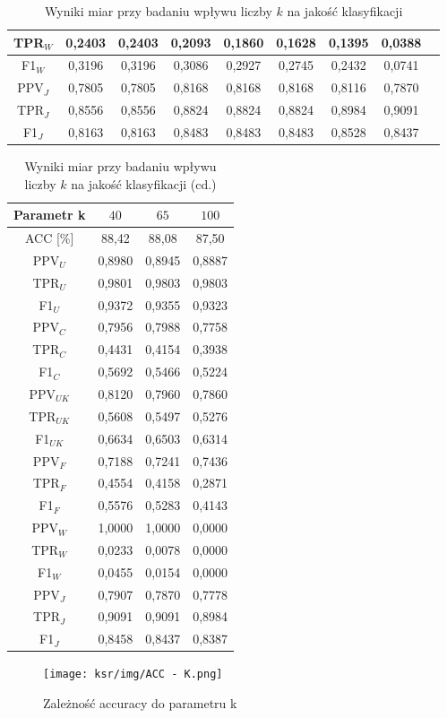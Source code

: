 \documentclass{article}
\begin{document}
\begin{table}[h!]
\begin{tabular}{|c|c|c|c|c|c|c|c|c|}
    TPR\(_W\) & 0,2403 & 0,2403 & 0,2093 & 0,1860& 0,1628& 0,1395& 0,0388\\ \hline
    F1\(_W\) & 0,3196 & 0,3196 & 0,3086 & 0,2927& 0,2745& 0,2432& 0,0741\\ \hline
    PPV\(_J\) & 0,7805 & 0,7805 & 0,8168 & 0,8168& 0,8168& 0,8116& 0,7870\\ \hline
    TPR\(_J\) & 0,8556 & 0,8556 & 0,8824 &  0,8824& 0,8824& 0,8984& 0,9091\\ \hline
    F1\(_J\) & 0,8163 & 0,8163 & 0,8483 &  0,8483& 0,8483& 0,8528& 0,8437\\ \hline
    \end{tabular}
    \caption{Wyniki miar przy badaniu wpływu liczby \(k\) na jakość klasyfikacji}
\end{table}
\begin{table}[H]
    \centering
    \begin{tabular}{|c|c|c|c|}
    \hline
    \textbf{Parametr k} & \textbf{\(40\)} & \textbf{\(65\)} & \textbf{\(100\)}\\ \hline
    ACC [\%]  & 88,42 & 88,08 & 87,50\\ \hline
    PPV\(_U\) & 0,8980& 0,8945 & 0,8887\\ \hline
    TPR\(_U\) & 0,9801& 0,9803 & 0,9803\\ \hline
    F1\(_U\) & 0,9372& 0,9355& 0,9323\\ \hline
    PPV\(_C\) & 0,7956& 0,7988& 0,7758\\ \hline
    TPR\(_C\) & 0,4431& 0,4154& 0,3938\\ \hline
    F1\(_C\) & 0,5692& 0,5466& 0,5224\\ \hline
    PPV\(_{UK}\) & 0,8120& 0,7960& 0,7860\\ \hline
    TPR\(_{UK}\) & 0,5608& 0,5497& 0,5276\\ \hline
    F1\(_{UK}\) & 0,6634& 0,6503& 0,6314\\ \hline
    PPV\(_F\) & 0,7188& 0,7241 & 0,7436\\ \hline
    TPR\(_F\) & 0,4554& 0,4158 & 0,2871\\ \hline
    F1\(_F\) & 0,5576& 0,5283 & 0,4143\\ \hline
    PPV\(_W\) & 1,0000& 1,0000 & 0,0000\\ \hline
    TPR\(_W\) & 0,0233& 0,0078& 0,0000\\ \hline
    F1\(_W\) & 0,0455& 0,0154& 0,0000\\ \hline
    PPV\(_J\) & 0,7907& 0,7870& 0,7778\\ \hline
    TPR\(_J\) & 0,9091& 0,9091& 0,8984\\ \hline
    F1\(_J\) & 0,8458& 0,8437& 0,8387\\ \hline
    \end{tabular}
    \caption{Wyniki miar przy badaniu wpływu liczby \(k\) na jakość klasyfikacji (cd.)}
\end{table}
\begin{figure}[H]
    \centering
    \texttt{[image: ksr/img/ACC - K.png]}
    \caption{Zależność accuracy do parametru k}
    \label{fig:moj-obraz}
\end{figure}
\end{document}
